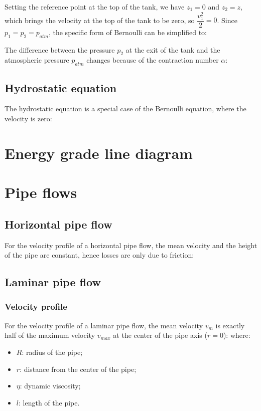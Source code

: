 \documentclass{article}
\begin{document}
Setting the reference point at the top of the tank, we have $z_1 = 0$ and $z_2 = z$,
which brings the velocity at the top of the tank to be zero, so $\dfrac{v_1^2}{2} = 0$.
Since $p_1=p_2=p_{atm}$, the specific form of Bernoulli can be simplified to:

The difference between the pressure $p_2$ at the exit of the tank and the atmospheric pressure $p_{atm}$
changes because of the contraction number $\alpha$:

\subsection{Hydrostatic equation}
The hydrostatic equation is a special case of the Bernoulli equation, where the velocity is zero:

\newpage
\section{Energy grade line diagram}


\newpage
\section{Pipe flows}
\subsection{Horizontal pipe flow}
For the velocity profile of a horizontal pipe flow, the mean velocity and the height
of the pipe are constant, hence losses are only due to friction:

\subsection{Laminar pipe flow}
\subsubsection{Velocity profile}
For the velocity profile of a laminar pipe flow, the mean velocity $v_m$ is exactly
half of the maximum velocity $v_{max}$ at the center of the pipe axis ($r=0$):
where:
\begin{itemize}
    \item $R$: radius of the pipe;
    \item $r$: distance from the center of the pipe;
    \item $\eta$: dynamic viscosity;
    \item $l$: length of the pipe.
\end{itemize}
\end{document}
